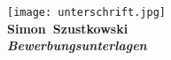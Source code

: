 \documentclass[11pt,a4paper]{article}
\def\firstname{Simon}
\def\familyname{Szustkowski}
\begin{document}
  
%
\texttt{[image: unterschrift.jpg]}\\
{\bfseries \firstname~\familyname}\\
%
\vfill%
{\slshape \bfseries Bewerbungsunterlagen}\\
\end{document}
